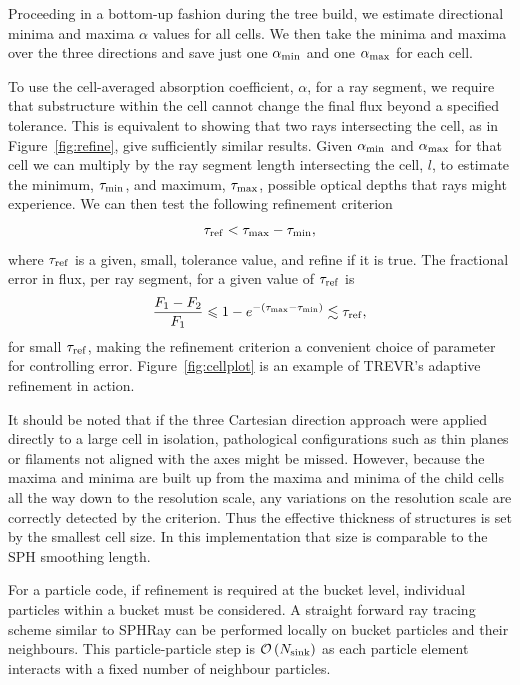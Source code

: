 \documentclass[fleq,usenatbib]{mnras}
\newcommand{\acro}{TREVR}
\newcommand{\bigO}[1]{\mathcal{O}\left(#1\right)}
\newcommand{\NK}{N_{\rm sink}}
\newcommand{\tr}{\tau_{\rm ref}}
\begin{document}
{Proceeding in a bottom-up fashion 
during the tree build, we estimate directional minima and maxima $\alpha$ values for all cells.
 We then take the minima and maxima
over the three directions and save just one $\alpha_{\rm min}$ and one $\alpha_{\rm max}$
for each cell.  

To use the cell-averaged absorption coefficient, $\alpha$, for a ray segment,
we require that substructure within the cell cannot change the final flux
beyond a specified tolerance. This is equivalent to showing that two rays 
intersecting the cell, as in Figure~\ref{fig:refine}, give sufficiently 
similar results. Given $\alpha_{\rm min}$ and $\alpha_{\rm max}$ for that cell 
we can multiply by the ray segment length intersecting the cell, $l$, to 
estimate the minimum, $\tau_{\rm min}$, and maximum, $\tau_{\rm max}$, 
possible optical depths that rays might experience. We can then test the 
following refinement criterion
\begin{equation}
\label{eqn:refcrit}
\tr < \tau_{\rm max} - \tau_{\rm min},
\end{equation}
where $\tr$ is a given, small, tolerance value, and refine if it is true. The 
fractional error in flux, per ray segment, for a given value of $\tr$ is
\begin{equation}
\label{eqn:reffrac}
\frac{F_1 - F_2}{F_1} \leq 1 - e^{-(\tau_{\rm max}-\tau_{\rm min})} 
\lesssim \tr,
\end{equation}
for small $\tr$, making the refinement criterion a convenient choice of 
parameter for controlling error. Figure~\ref{fig:cellplot} is an example of 
\acro{}'s adaptive refinement in action.

It should be noted that if the three Cartesian direction approach were
applied directly to a large cell in isolation, pathological configurations such
as thin planes or filaments not aligned with the axes might be missed.
However, because the maxima and minima are built up from the maxima
and minima of the child cells all the way down to the resolution
scale, any variations on the resolution scale are 
correctly detected by the criterion.  Thus the effective thickness of 
structures is set by the smallest cell size.  In this implementation
that size is comparable to the SPH smoothing length.

For a particle code, if refinement is required at the bucket level, individual 
particles within a bucket must be considered.  A straight forward ray tracing 
scheme similar to SPHRay \citep{altayEt08} can be performed locally on bucket 
particles and their neighbours. This particle-particle step is $\bigO{\NK}$ as 
each particle element interacts with a fixed number of neighbour particles.

}
\end{document}
